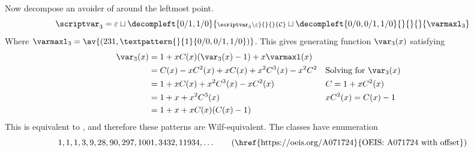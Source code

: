 Now decompose an avoider of 
around the leftmost point.
\begin{equation*}
    \scriptvar_3 = \varepsilon \sqcup
    \decompleft{0/1,1/0}{\scriptstyle \scriptvar_3\setminus\varepsilon}{}{}{\mathcal{C}}
    \sqcup \decompleft{0/0,0/1,1/0}{}{}{}{\varmaxl_3}
\end{equation*}
Where \(\mathcal{\varmaxl}_3 = \av{(231,\textpattern{}{1}{0/0,0/1,1/0})}\).
This gives generating function \(\var_3(x)\) satisfying
\begin{equation*}
    \begin{aligned}
        \var_3(x) &= 1 +xC(x)(\var_3(x)-1) + x\varmaxl(x)\\
        &= C(x) - xC^2(x) + xC(x) +x^2C^3(x) - x^2C^2 && \text{Solving for \(\var_3(x)\)}\\
        &= 1 + xC(x) +x^2C^3(x)-xC^2(x) && C = 1+xC^2(x)\\
        &= 1 + x + x^2C^3(x) && xC^2(x) = C(x)-1\\
        &= 1 + x + xC(x)(C(x)-1)
    \end{aligned}
\end{equation*}
This is equivalent to , and therefore these patterns are Wilf-equivalent.
The classes have enumeration
\begin{equation*}
    1, 1, 1, 3, 9, 28, 90, 297, 1001, 3432, 11934,\dotsc \tag{\href{https://oeis.org/A071724}{OEIS: A071724 with offset}}
\end{equation*}
